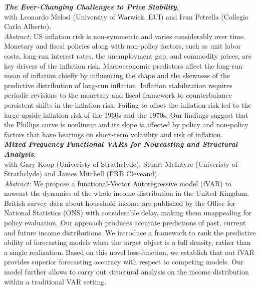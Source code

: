 \documentclass[a4paper,12pt]{article}
\begin{document}
\textit{\textbf{The Ever-Changing Challenges to Price Stability}},\\with Leonardo Melosi (University of Warwick, EUI) and Ivan Petrella (Collegio Carlo Alberto).\\[.5em]
\textit{Abstract:} US inflation risk is non-symmetric and varies considerably over time. Monetary and fiscal policies along with non-policy factors, such as unit labor costs, long-run interest rates, the unemployment gap, and commodity prices, are key drivers of the inflation risk. Macroeconomic predictors affect the long-run mean of inflation chiefly by influencing the shape and the skewness of the predictive distribution of long-run inflation. Inflation stabilization requires periodic revisions to the monetary and fiscal framework to counterbalance persistent shifts in the inflation risk. Failing to offset the inflation risk led to the large upside inflation risk of the 1960s and the 1970s. Our findings suggest that the Phillips curve is nonlinear and its slope is affected by policy and non-policy factors that have bearings on short-term volatility and risk of inflation.\\[.5em]

\textit{\textbf{Mixed Frequency Functional VARs for Nowcasting and Structural Analysis}},\\ with Gary Koop (Univeristy of Strathclyde), Stuart McIntyre (Univeristy of Strathclyde) and James Mitchell (FRB Cleveand).\\[.5em]
\textit{Abstract:} We propose a functional-Vector Autoregressive model (fVAR) to nowcast the dynamics of the whole income distribution in the United Kingdom. British survey data about household income are published by the Office for National Statistics (ONS) with considerable delay, making them unappealing for policy evaluation. Our approach produces accurate predictions of past, current and future income distributions. We introduce a framework to rank the predictive ability of forecasting models when the target object is a full density, rather than a single realization. Based on this novel loss-function, we establish that out fVAR provides superior forecasting accuracy with respect to competing models. Our model further allows to carry out structural analysis on the income distribution within a traditional VAR setting.\\[.5em]
\end{document}
